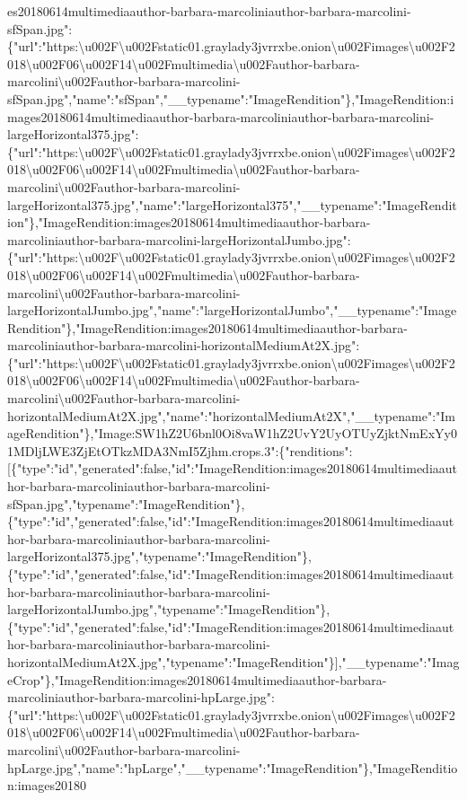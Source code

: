 es20180614multimediaauthor-barbara-marcoliniauthor-barbara-marcolini-sfSpan.jpg":\{"url":"https:\textbackslash{}u002F\textbackslash{}u002Fstatic01.graylady3jvrrxbe.onion\textbackslash{}u002Fimages\textbackslash{}u002F2018\textbackslash{}u002F06\textbackslash{}u002F14\textbackslash{}u002Fmultimedia\textbackslash{}u002Fauthor-barbara-marcolini\textbackslash{}u002Fauthor-barbara-marcolini-sfSpan.jpg","name":"sfSpan","\_\_typename":"ImageRendition"\},"ImageRendition:images20180614multimediaauthor-barbara-marcoliniauthor-barbara-marcolini-largeHorizontal375.jpg":\{"url":"https:\textbackslash{}u002F\textbackslash{}u002Fstatic01.graylady3jvrrxbe.onion\textbackslash{}u002Fimages\textbackslash{}u002F2018\textbackslash{}u002F06\textbackslash{}u002F14\textbackslash{}u002Fmultimedia\textbackslash{}u002Fauthor-barbara-marcolini\textbackslash{}u002Fauthor-barbara-marcolini-largeHorizontal375.jpg","name":"largeHorizontal375","\_\_typename":"ImageRendition"\},"ImageRendition:images20180614multimediaauthor-barbara-marcoliniauthor-barbara-marcolini-largeHorizontalJumbo.jpg":\{"url":"https:\textbackslash{}u002F\textbackslash{}u002Fstatic01.graylady3jvrrxbe.onion\textbackslash{}u002Fimages\textbackslash{}u002F2018\textbackslash{}u002F06\textbackslash{}u002F14\textbackslash{}u002Fmultimedia\textbackslash{}u002Fauthor-barbara-marcolini\textbackslash{}u002Fauthor-barbara-marcolini-largeHorizontalJumbo.jpg","name":"largeHorizontalJumbo","\_\_typename":"ImageRendition"\},"ImageRendition:images20180614multimediaauthor-barbara-marcoliniauthor-barbara-marcolini-horizontalMediumAt2X.jpg":\{"url":"https:\textbackslash{}u002F\textbackslash{}u002Fstatic01.graylady3jvrrxbe.onion\textbackslash{}u002Fimages\textbackslash{}u002F2018\textbackslash{}u002F06\textbackslash{}u002F14\textbackslash{}u002Fmultimedia\textbackslash{}u002Fauthor-barbara-marcolini\textbackslash{}u002Fauthor-barbara-marcolini-horizontalMediumAt2X.jpg","name":"horizontalMediumAt2X","\_\_typename":"ImageRendition"\},"Image:SW1hZ2U6bnl0Oi8vaW1hZ2UvY2UyOTUyZjktNmExYy01MDljLWE3ZjEtOTkzMDA3NmI5Zjhm.crops.3":\{"renditions":{[}\{"type":"id","generated":false,"id":"ImageRendition:images20180614multimediaauthor-barbara-marcoliniauthor-barbara-marcolini-sfSpan.jpg","typename":"ImageRendition"\},\{"type":"id","generated":false,"id":"ImageRendition:images20180614multimediaauthor-barbara-marcoliniauthor-barbara-marcolini-largeHorizontal375.jpg","typename":"ImageRendition"\},\{"type":"id","generated":false,"id":"ImageRendition:images20180614multimediaauthor-barbara-marcoliniauthor-barbara-marcolini-largeHorizontalJumbo.jpg","typename":"ImageRendition"\},\{"type":"id","generated":false,"id":"ImageRendition:images20180614multimediaauthor-barbara-marcoliniauthor-barbara-marcolini-horizontalMediumAt2X.jpg","typename":"ImageRendition"\}{]},"\_\_typename":"ImageCrop"\},"ImageRendition:images20180614multimediaauthor-barbara-marcoliniauthor-barbara-marcolini-hpLarge.jpg":\{"url":"https:\textbackslash{}u002F\textbackslash{}u002Fstatic01.graylady3jvrrxbe.onion\textbackslash{}u002Fimages\textbackslash{}u002F2018\textbackslash{}u002F06\textbackslash{}u002F14\textbackslash{}u002Fmultimedia\textbackslash{}u002Fauthor-barbara-marcolini\textbackslash{}u002Fauthor-barbara-marcolini-hpLarge.jpg","name":"hpLarge","\_\_typename":"ImageRendition"\},"ImageRendition:images20180